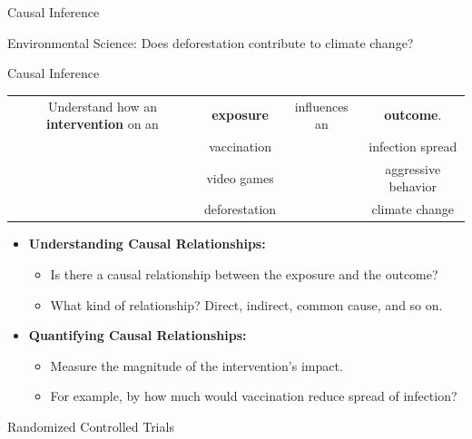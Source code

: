 \documentclass[aspectratio=169]{beamer}
\begin{document}
\begin{frame}{Causal Inference}
{\begin{figure}
\begin{subfigure}{0.35 \textwidth}
		\end{subfigure}
	\end{figure}
	\vspace{1em}
	Environmental Science: Does deforestation contribute to climate change?
	}
\end{frame}

\begin{frame}{Causal Inference}
	\begin{tabular}{cccc}
		Understand how an \textbf{intervention} on an & \textbf{exposure} & influences an & \textbf{outcome}. \\
							      & vaccination & & infection spread \\
							      & video games & & aggressive behavior \\
							      & deforestation & & climate change \\
	\end{tabular}
	\vspace{2em}

	\begin{itemize}
		\item \textbf{Understanding Causal Relationships: }
			\begin{itemize}
				\item Is there a causal relationship between the exposure and the outcome?
				\item What kind of relationship? Direct, indirect, common cause, and so on.
			\end{itemize}
		\item \textbf{Quantifying Causal Relationships: }
			\begin{itemize}
				\item Measure the magnitude of the intervention's impact.
				\item For example, by how much would vaccination reduce spread of infection?
			\end{itemize}
	\end{itemize}
\end{frame}

\begin{frame}{Randomized Controlled Trials}
\end{frame}
\end{document}
